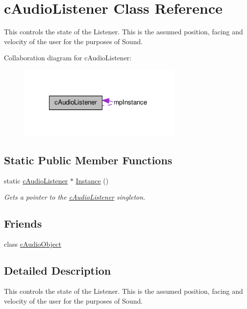 \hypertarget{classc_audio_listener}{
\section{cAudioListener Class Reference}
\label{classc_audio_listener}
}


This controls the state of the Listener. This is the assumed position, facing and velocity of the user for the purposes of Sound.  




Collaboration diagram for cAudioListener:\nopagebreak
\begin{figure}[H]
\begin{center}
\leavevmode
\includegraphics[width=230pt]{classc_audio_listener__coll__graph}
\end{center}
\end{figure}
\subsection*{Static Public Member Functions}
\begin{DoxyCompactItemize}
\item 
\hypertarget{classc_audio_listener_a2269493a4603684e6effdf9427fee175}{
static \hyperlink{classc_audio_listener}{cAudioListener} $\ast$ \hyperlink{classc_audio_listener_a2269493a4603684e6effdf9427fee175}{Instance} ()}
\label{classc_audio_listener_a2269493a4603684e6effdf9427fee175}

\begin{DoxyCompactList}\small\item\em Gets a pointer to the \hyperlink{classc_audio_listener}{cAudioListener} singleton. \end{DoxyCompactList}\end{DoxyCompactItemize}
\subsection*{Friends}
\begin{DoxyCompactItemize}
\item 
\hypertarget{classc_audio_listener_a62507a4ca159e2ef51ac9bc1bc5bfeb6}{
class \hyperlink{classc_audio_listener_a62507a4ca159e2ef51ac9bc1bc5bfeb6}{cAudioObject}}
\label{classc_audio_listener_a62507a4ca159e2ef51ac9bc1bc5bfeb6}

\end{DoxyCompactItemize}


\subsection{Detailed Description}
This controls the state of the Listener. This is the assumed position, facing and velocity of the user for the purposes of Sound. 